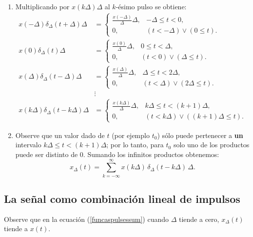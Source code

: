 \begin{enumerate}
	\item Multiplicando por $x(k\Delta)\Delta$ al $k$-ésimo pulso se obtiene:
	\begin{align}
		x(-\Delta)\delta_{\Delta}(t+\Delta)\Delta &=
		\begin{cases}
			\frac{x(-\Delta)}{\Delta}\Delta, & -\Delta \leq t < 0, \\ 
			0, & (t < -\Delta) \lor (0 \leq t).
		\end{cases} \\
		x(0)\delta_{\Delta}(t)\Delta &=
		\begin{cases}
			\frac{x(0)}{\Delta}\Delta, & 0 \leq t < \Delta, \\ 
			0, & (t < 0) \lor (\Delta \leq t).
		\end{cases} \\
		x(\Delta)\delta_{\Delta}(t-\Delta)\Delta &=
		\begin{cases}
			\frac{x(\Delta)}{\Delta}\Delta, & \Delta \leq t < 2\Delta, \\ 
			0, & (t < \Delta) \lor (2\Delta \leq t).
		\end{cases} \\
		&\vdots \nonumber \\
		x(k\Delta)\delta_{\Delta}(t-k\Delta)\Delta &=
		\begin{cases}
			\frac{x(k\Delta)}{\Delta}\Delta, & k\Delta \leq t < (k+1)\Delta, \\ 
			0, & (t < k\Delta) \lor ((k+1)\Delta \leq t).
		\end{cases}
	\end{align}
	
	\item Observe que un valor dado de $t$ (por ejemplo $t_{0}$) sólo puede pertenecer a \textbf{un} intervalo 
	$k\Delta \leq t < (k+1)\Delta$; por lo tanto, para $t_{0}$ solo uno de los productos puede ser distinto de $0$.
	Sumando los infinitos productos obtenemos:
	\begin{equation}
		x_{\Delta}(t) = \sum_{k=-\infty}^{\infty} x(k\Delta) \, \delta_{\Delta}(t-k\Delta) \, \Delta .
		\label{funcaspulsessum}
	\end{equation}
\end{enumerate}

\subsection{La señal como combinación lineal de impulsos}

Observe que en la ecuación (\ref{funcaspulsessum}) cuando 
$\Delta$ tiende a cero, $x_{\Delta}(t)$ tiende a $x(t)$.


